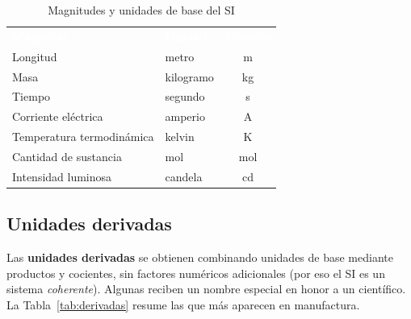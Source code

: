\documentclass[12pt,a4paper]{article}
\newcommand{\encab}[1]{\textcolor{white}{\sffamily\bfseries #1}}
\begin{document}
\begin{table}[!htb]
	\centering
	\caption{Magnitudes y unidades de base del SI}\label{tab:base}
	\small
	\begin{tabular}{l l c }
		\rowcolor{darkblue}
		\encab{Magnitud}          & \encab{Unidad} & \encab{Símbolo} \\
		Longitud                  & metro          & m               \\
		Masa                      & kilogramo      & kg              \\
		Tiempo                    & segundo        & s               \\
		Corriente eléctrica       & amperio        & A               \\
		Temperatura termodinámica & kelvin         & K               \\
		Cantidad de sustancia     & mol            & mol             \\
		Intensidad luminosa       & candela        & cd              \\
	\end{tabular}
\end{table}

\subsection{Unidades derivadas}

Las \textbf{unidades derivadas} se obtienen combinando unidades de base mediante
productos y cocientes, sin factores numéricos adicionales (por eso el SI es un
sistema \emph{coherente}). Algunas reciben un nombre especial en honor a un
científico. La Tabla~\ref{tab:derivadas} resume las que más aparecen en
manufactura.\\[-4pt]
\end{document}
